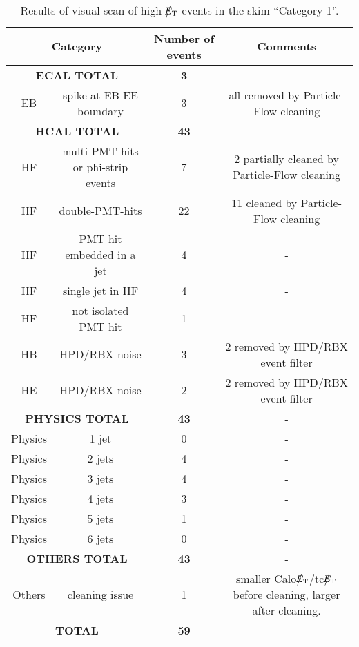 \begin{table}[h]
  \begin{center}
    \begin{tabular}{|c|c|c|c|}
      \hline
      \multicolumn{2}{|c|}{Category} & Number of events  & Comments   \\ 
      \hline\hline
      \multicolumn{2}{|c|}{\bf ECAL TOTAL} & \bf{3}      & - \\
      \hline
      EB & spike at EB-EE boundary & 3 & all removed by Particle-Flow cleaning \\     
      \hline    
      \multicolumn{2}{|c|}{\bf HCAL TOTAL} & \bf{43}      & - \\
      \hline
      HF & multi-PMT-hits or phi-strip events & 7 & 2 partially cleaned by Particle-Flow cleaning \\           
      HF & double-PMT-hits & 22 & 11 cleaned by Particle-Flow cleaning \\           
      HF & PMT hit embedded in a jet & 4 & - \\           
      HF & single jet in HF & 4 & - \\           
      HF & not isolated PMT hit & 1 & - \\           
      HB & HPD/RBX noise & 3 & 2 removed by HPD/RBX event filter \\           
      HE & HPD/RBX noise & 2 & 2 removed by HPD/RBX event filter \\           
      \hline    
      \multicolumn{2}{|c|}{\bf PHYSICS TOTAL} & \bf{43}      & - \\
      \hline
      Physics & 1 jet & 0 & - \\
      Physics & 2 jets & 4 & - \\
      Physics & 3 jets & 4 & - \\
      Physics & 4 jets & 3 & - \\
      Physics & 5 jets & 1 & - \\
      Physics & 6 jets & 0 & - \\
      \hline
      \multicolumn{2}{|c|}{\bf OTHERS TOTAL} & \bf{43}      & - \\
      \hline          
      Others & cleaning issue & 1 & smaller Calo$\big\slash\hspace{-1.6ex}{E_\text{T}}$/tc$\big\slash\hspace{-1.6ex}{E_\text{T}}$ before cleaning, larger after cleaning. \\
      \hline          
      \multicolumn{2}{|c|}{\bf TOTAL} & \bf{59}      & - \\
      \hline
    \end{tabular}
    \caption{Results of visual scan of high $\big\slash\hspace{-1.6ex}{E_\text{T}}$ events in the skim ``Category 1''.}
    \label{tab:Category1}
  \end{center}
\end{table}


